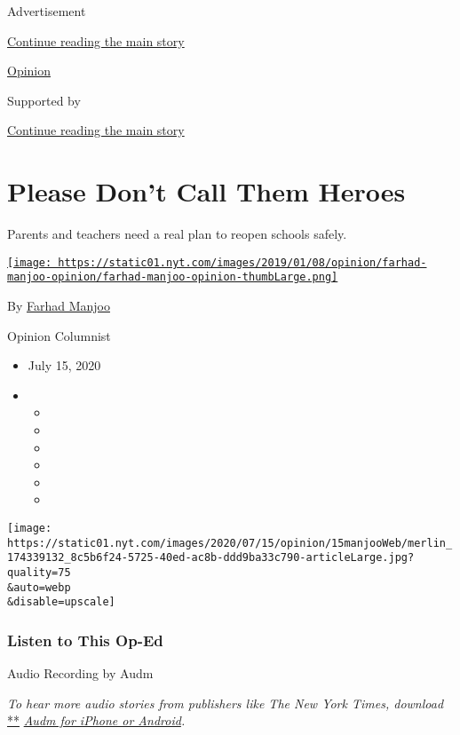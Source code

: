 Advertisement

\protect\hyperlink{after-top}{Continue reading the main story}

\href{/section/opinion}{Opinion}

Supported by

\protect\hyperlink{after-sponsor}{Continue reading the main story}

\hypertarget{please-dont-call-them-heroes}{%
\section{Please Don't Call Them
Heroes}\label{please-dont-call-them-heroes}}

Parents and teachers need a real plan to reopen schools safely.

\href{https://www.nytimes.com/by/farhad-manjoo}{\texttt{[image: https://static01.nyt.com/images/2019/01/08/opinion/farhad-manjoo-opinion/farhad-manjoo-opinion-thumbLarge.png]}}

By \href{https://www.nytimes.com/by/farhad-manjoo}{Farhad Manjoo}

Opinion Columnist

\begin{itemize}
\item
  July 15, 2020
\item
  \begin{itemize}
  \item
  \item
  \item
  \item
  \item
  \item
  \end{itemize}
\end{itemize}

\texttt{[image: https://static01.nyt.com/images/2020/07/15/opinion/15manjooWeb/merlin\_174339132\_8c5b6f24-5725-40ed-ac8b-ddd9ba33c790-articleLarge.jpg?quality=75\\\&auto=webp\\\&disable=upscale]}

\hypertarget{listen-to-this-op-ed}{%
\subsubsection{Listen to This Op-Ed}\label{listen-to-this-op-ed}}

Audio Recording by Audm

\emph{To hear more audio stories from publishers like The New York
Times, download}
\href{https://www.audm.com/?utm_source=nytmag\&utm_medium=embed\&utm_campaign=left_behind_draper}{**}
\href{https://www.audm.com/?utm_source=nytopinion\&utm_medium=embed\&utm_campaign=please_call_heroes}{\emph{Audm
for iPhone or Android}}\emph{.}

